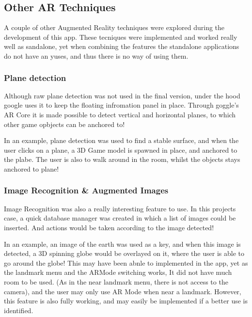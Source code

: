  \subsection{Other AR Techniques}
 A couple of other Augmented Reality techniques were explored during the development of this app. 
 These tecniques were implemented and worked really well as sandalone, yet when combining the features 
 the standalone applications do not have an yuses, and thus there is no way of using them. 
 \subsubsection{Plane detection}
 Although raw plane detection was not used in the final version, under the hood google uses it to keep the 
 floating infromation panel in place. Through goggle's AR Core it is made possible to detect vertical 
 and horizontal planes, to which other game opbjects can be anchored to!

 In an example, plane detection was used to find a stable surface, and when the user clicks on a 
 plane, a 3D Game model is spawned in place, and anchored to the plabe. The user is also to walk around 
 in the room, whilst the objects stays anchored to plane! 

 \subsubsection{Image Recognition \& Augmented Images}
 Image Recognition was also a really interesting feature to use. In this projects case, a quick 
 database manager was created in which a list of images could be inserted. And actions would be taken 
 according to the image detected!
 
In an example, an image of the earth was used as a key, and when this image is detected, a 3D spinning 
globe would be overlayed on it, where the user is able to go around the globe!
This may have been abnle to implemented in the app, yet as the landmark menu and the ARMode switching 
works, It did not have much room to be used. (As in the near landmark menu, there is 
not access to the camera), and the user may only use AR Mode when near a landmark. However, this 
feature is also fully working, and may easily be implemented if a better use is identified. 

